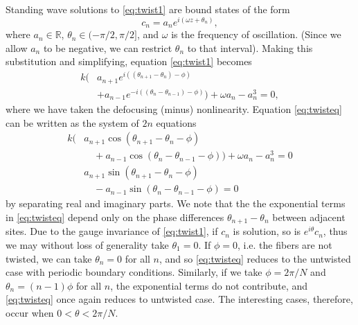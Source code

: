 \documentclass[reprint, amsmath,amssymb,aps]{revtex4-2}
\def\R{{\mathbb R}}
\begin{document}
Standing wave solutions to \cref{eq:twist1} are bound states of the form
\begin{equation}\label{eq:ansatz1}
c_n = a_n e^{i (\omega z + \theta_n) },
\end{equation}
where $a_n \in \R$, $\theta_n \in (-\pi/2, \pi/2]$, and $\omega$ is the frequency of oscillation. (Since we allow $a_n$ to be negative, we can restrict $\theta_n$ to that interval). Making this substitution and simplifying, equation \cref{eq:twist1} becomes
\begin{equation}\label{eq:twisteq}
\begin{aligned}
k\Big( &a_{n+1} e^{i((\theta_{n+1}-\theta_n)-\phi)} \\
&+ a_{n-1} e^{-i((\theta_n - \theta_{n-1})-\phi)}\Big) + \omega a_n - a_n^3 = 0,
\end{aligned}
\end{equation}
where we have taken the defocusing (minus) nonlinearity. Equation \cref{eq:twisteq} can be written as the system of $2n$ equations
\begin{equation}\label{eq:twisteqreal}
\begin{aligned}
k\big( &a_{n+1} \cos(\theta_{n+1}-\theta_n-\phi) \\
&\quad+a_{n-1} \cos(\theta_n - \theta_{n-1}-\phi)\big) + \omega a_n -  a_n^3 = 0 \\\
&a_{n+1} \sin(\theta_{n+1}-\theta_n-\phi) \\
&\quad-a_{n-1} \sin(\theta_n - \theta_{n-1}-\phi) = 0
\end{aligned}
\end{equation}
by separating real and imaginary parts. We note that the the exponential terms in \cref{eq:twisteq} depend only on the phase differences $\theta_{n+1}-\theta_n$ between adjacent sites. Due to the gauge invariance of \cref{eq:twist1}, if $c_n$ is solution, so is $e^{i \theta} c_n$, thus we may without loss of generality take $\theta_1 = 0$. If $\phi = 0$, i.e. the fibers are not twisted, we can take $\theta_n = 0$ for all $n$, and so \cref{eq:twisteq} reduces to the untwisted case with periodic boundary conditions. Similarly, if we take $\phi = 2 \pi/N$ and $\theta_n = (n-1)\phi$ for all $n$, the exponential terms do not contribute, and \cref{eq:twisteq} once again reduces to untwisted case. The interesting cases, therefore, occur when $0 < \theta < 2 \pi/N$. 
\end{document}
